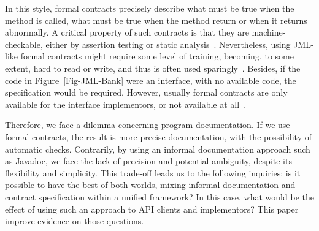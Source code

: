 In this style, formal contracts precisely describe what must be true when the method is called, what must be true when the method return or when it returns abnormally. A critical property of such contracts is that they are machine-checkable, either by assertion testing or static analysis~\cite{Chalin06}.
Nevertheless, using JML-like formal contracts might require some level of training, becoming, to some extent, hard to read or write, and thus is often used sparingly~\cite{Chalin06,Polikarpova-etal09,typeContracts}.
Besides, if the code in Figure~\ref{Fig-JML-Bank} were an interface, with no available code, the specification would be required. However, usually formal contracts are only available for the interface implementors, or not available at all~\cite{Parnas2011}.

Therefore, we face a dilemma concerning program documentation. If we use formal contracts, the result is more precise documentation, with the possibility of automatic checks.
Contrarily, by using an informal documentation approach such as Javadoc, we face the lack of precision and potential ambiguity, despite its flexibility and simplicity. This trade-off leads us to the following inquiries: is it possible to have the best of both worlds, mixing informal documentation and contract specification within a unified framework? In this case, what would be the effect of using such an approach to API clients and implementors? This paper improve evidence on those questions.

